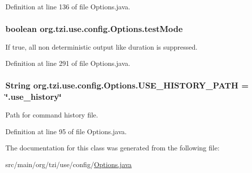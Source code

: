 Definition at line 136 of file Options.\-java.

\hypertarget{classorg_1_1tzi_1_1use_1_1config_1_1_options_ab7cc544d9f2e2d9411a0b3db893fe197}{
\subsubsection[{test\-Mode}]{\setlength{\rightskip}{0pt plus 5cm}boolean org.\-tzi.\-use.\-config.\-Options.\-test\-Mode\hspace{0.3cm}{\ttfamily [static]}}}\label{classorg_1_1tzi_1_1use_1_1config_1_1_options_ab7cc544d9f2e2d9411a0b3db893fe197}
If {\ttfamily true}, all non deterministic output like duration is suppressed. 

Definition at line 291 of file Options.\-java.

\hypertarget{classorg_1_1tzi_1_1use_1_1config_1_1_options_a18cd55fcda03ba0c2c036a7e9d186408}{
\subsubsection[{U\-S\-E\-\_\-\-H\-I\-S\-T\-O\-R\-Y\-\_\-\-P\-A\-T\-H}]{\setlength{\rightskip}{0pt plus 5cm}String org.\-tzi.\-use.\-config.\-Options.\-U\-S\-E\-\_\-\-H\-I\-S\-T\-O\-R\-Y\-\_\-\-P\-A\-T\-H = \char`\"{}.use\-\_\-history\char`\"{}\hspace{0.3cm}{\ttfamily [static]}}}\label{classorg_1_1tzi_1_1use_1_1config_1_1_options_a18cd55fcda03ba0c2c036a7e9d186408}
Path for command history file. 

Definition at line 95 of file Options.\-java.



The documentation for this class was generated from the following file\-:\begin{DoxyCompactItemize}
\item 
src/main/org/tzi/use/config/\hyperlink{_options_8java}{Options.\-java}\end{DoxyCompactItemize}
